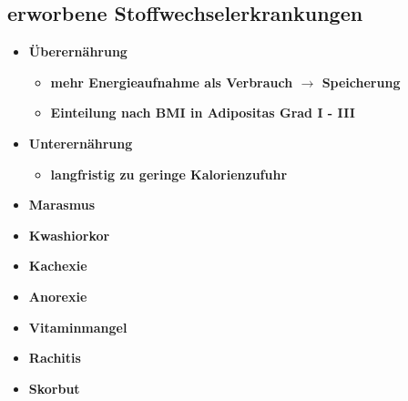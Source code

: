 \subsection{erworbene Stoffwechselerkrankungen}
	\begin{itemize}
		\item \textbf{Überernährung}
			\begin{itemize}
				\item \textbf{mehr Energieaufnahme als Verbrauch $\rightarrow$ Speicherung}
				\item \textbf{Einteilung nach BMI in Adipositas Grad I - III}
			\end{itemize}
		\item \textbf{Unterernährung}
			\begin{itemize}
				\item \textbf{langfristig zu geringe Kalorienzufuhr}
			\end{itemize}
		\item \textbf{Marasmus}
		\item \textbf{Kwashiorkor}
		\item \textbf{Kachexie}
		\item \textbf{Anorexie}
		\item \textbf{Vitaminmangel}
		\item \textbf{Rachitis}
		\item \textbf{Skorbut}
	\end{itemize}